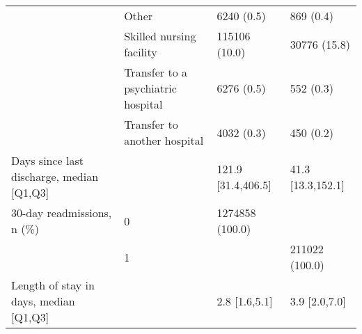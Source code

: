 \begin{tabular}{llll}
                                       & Other &                     6240 (0.5) &          869 (0.4) \\
                                       & Skilled nursing facility &                  115106 (10.0) &       30776 (15.8) \\
                                       & Transfer to a psychiatric hospital &                     6276 (0.5) &          552 (0.3) \\
                                       & Transfer to another hospital &                     4032 (0.3) &          450 (0.2) \\
Days since last discharge, median [Q1,Q3] &   &             121.9 [31.4,406.5] &  41.3 [13.3,152.1] \\
30-day readmissions, n (\%) & 0 &                1274858 (100.0) &                    \\
                                       & 1 &                                &     211022 (100.0) \\
Length of stay in days, median [Q1,Q3] &   &                  2.8 [1.6,5.1] &      3.9 [2.0,7.0] \\
\bottomrule
\end{tabular}
